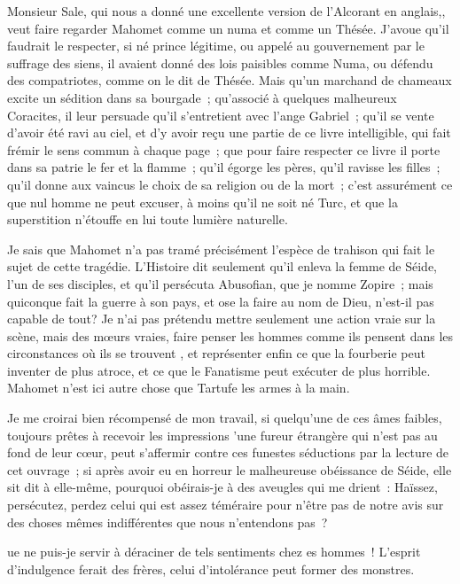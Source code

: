 \documentclass[french,twoside]{book} %
\begin{document}
Monsieur Sale, qui nous a donné une excellente version de l’Alcorant en anglais,, veut faire regarder Mahomet comme un numa et comme un Thésée. J’avoue qu’il faudrait le respecter, si né prince légitime, ou appelé au gouvernement par le suffrage des siens, il avaient donné des lois paisibles comme Numa, ou défendu des compatriotes, comme on le dit de Thésée. Mais qu’un marchand de chameaux excite un sédition dans sa bourgade ; qu’associé à quelques malheureux Coracites, il leur persuade qu’il s’entretient avec l’ange Gabriel ; qu’il se vente d’avoir été ravi au ciel, et d’y avoir reçu une partie de ce livre intelligible, qui fait frémir le sens commun à chaque page ; que pour faire respecter ce livre il porte dans sa patrie le fer et la flamme ; qu’il égorge les pères, qu’il ravisse les filles ; qu’il donne aux vaincus le choix de sa religion ou de la mort ; c’est assurément ce que nul homme ne peut excuser, à moins qu’il ne soit né Turc, et que la superstition n’étouffe en lui toute lumière naturelle.\par
Je sais que Mahomet n’a pas tramé précisément l’espèce de trahison qui fait le sujet de cette tragédie. L’Histoire dit seulement qu’il enleva la femme de Séide, l’un de ses disciples, et qu’il persécuta Abusofian, que je nomme Zopire ; mais quiconque fait la guerre à son pays, et ose la faire au nom de Dieu, n’est-il pas capable de tout? Je n’ai pas prétendu mettre seulement une action vraie sur la scène, mais des mœurs vraies, faire penser les hommes comme ils pensent dans les circonstances où ils se trouvent , et représenter enfin ce que la fourberie peut inventer de plus atroce, et ce que le Fanatisme peut exécuter de plus horrible. Mahomet n’est ici autre chose que Tartufe les armes à la main.\par
Je me croirai bien récompensé de mon travail, si quelqu’une de ces âmes faibles, toujours prêtes à recevoir les impressions ’une fureur étrangère qui n’est pas au fond de leur cœur, peut s’affermir contre ces funestes séductions par la lecture de cet ouvrage ; si après avoir eu en horreur le malheureuse obéissance de Séide, elle sit dit à elle-même, pourquoi obéirais-je à des aveugles qui me drient : Haïssez, persécutez, perdez celui qui est assez téméraire pour n’être pas de notre avis sur des choses mêmes indifférentes que nous n’entendons pas ?\par
ue ne puis-je servir à déraciner de tels sentiments chez es hommes ! L’esprit d’indulgence ferait des frères, celui d’intolérance peut former des monstres.\par
\end{document}
